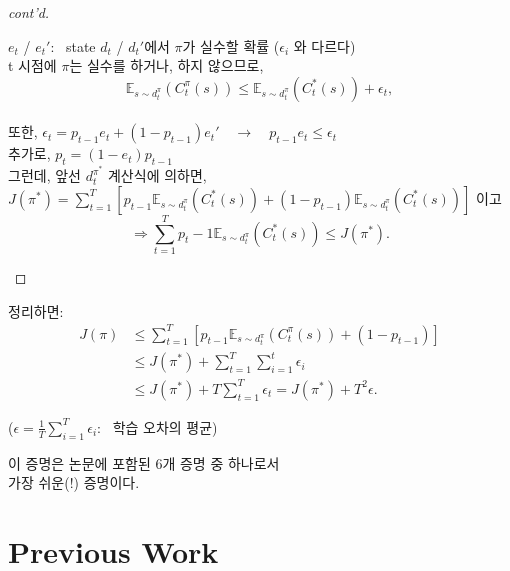 \documentclass[11pt,xcolor={dvipsnames},hyperref={pdftex,pdfpagemode=UseNone,hidelinks,pdfdisplaydoctitle=true},usepdftitle=false]{beamer}
\begin{document}
\begin{frame}
\begin{proof}[cont'd]
    \begin{spacing}{1.5}
    \(e_t\) / \(e_t'\): \, state \(d_t\) / \(d_t'\)에서 \(\pi\)가 실수할 확률 ($\epsilon_i$ 와 다르다) \\
    t 시점에 $\pi$는 실수를 하거나, 하지 않으므로,
    \[
    \mathbb{E}_{s \sim d_t^{\pi}} (C_t^\pi (s)) \leq \mathbb{E}_{s \sim d_t^{\pi}} (C_t^* (s)) + \epsilon_t,
    \] \\ 
    또한, $\epsilon_t = p_{t - 1} e_t + (1 - p_{t-1}) e_t' \quad {\rightarrow} \quad p_{t - 1} e_t \leq \epsilon_t$ \\
    추가로, \(p_t = (1 - e_t)p_{t - 1}\) \\
    그런데, 앞선 $d_t^{\pi^*}$ 계산식에 의하면, \\
    \(J(\pi^*) = \sum_{t=1}^T [p_{t - 1} \mathbb{E}_{s \sim d_t^{\pi}} (C_t^* (s)) + (1 - p_{t-1}) \mathbb{E}_{s \sim d_t^{\pi}} (C_t^* (s))]\) 이고
    \[ \Longrightarrow  
    \sum_{t=1}^T p_t - 1 \mathbb{E}_{s \sim d_t^{\pi}} (C_t^* (s)) \leq J(\pi^*).
    \]
    \end{spacing}
\end{proof}    
\end{frame}

\begin{frame}
\begin{spacedProof}[cont'd]
    정리하면:
    \begin{align}
        J(\pi) &\leq \sum_{t=1}^T \left[ p_{t - 1} \mathbb{E}_{s \sim d_t^{\pi}} (C_t^\pi (s)) + (1 - p_{t-1}) \right] \nonumber \\
        &\leq J(\pi^*) + \sum_{t=1}^T \sum_{i=1}^t \epsilon_i \nonumber \\
        &\leq J(\pi^*) + T \sum_{t=1}^T \epsilon_t = J(\pi^*) + T^2 \epsilon.
    \end{align}\end{spacedProof}    
    (\(\epsilon = \frac{1}{T} \sum_{i=1}^T \epsilon_i\): \, 학습 오차의 평균) \\

    \vspace{7mm}

    이 증명은 논문에 포함된 6개 증명 중 하나로서 \\ 가장 쉬운(!) 증명이다.

\end{frame}

\section{Previous Work}
\end{document}
